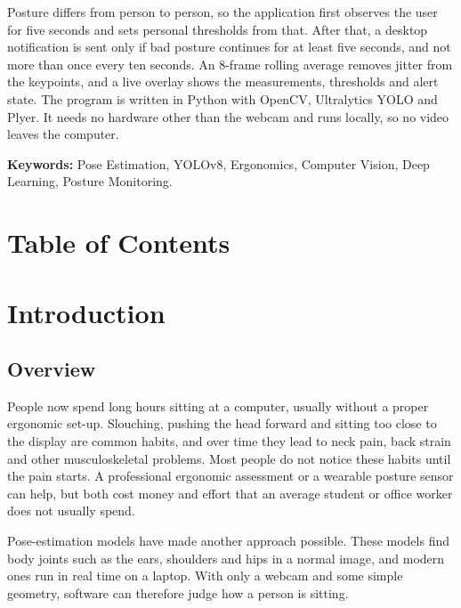 ﻿\documentclass[12pt,a4paper]{article}
\begin{document}
Posture differs from person to person, so the application first observes the user for five
seconds and sets personal thresholds from that. After that, a desktop notification is sent
only if bad posture continues for at least five seconds, and not more than once every ten
seconds. An 8-frame rolling average removes jitter from the keypoints, and a live overlay
shows the measurements, thresholds and alert state. The program is written in Python with
OpenCV, Ultralytics YOLO and Plyer. It needs no hardware other than the webcam and runs
locally, so no video leaves the computer.

\vspace{6pt}
\noindent\textbf{Keywords:} Pose Estimation, YOLOv8, Ergonomics, Computer Vision, Deep
Learning, Posture Monitoring.

\clearpage
\section*{Table of Contents}
\begingroup
{}
\makeatletter{}\makeatother
\endgroup

\clearpage
{}
\section{Introduction}

\subsection{Overview}
People now spend long hours sitting at a computer, usually without a proper ergonomic
set-up. Slouching, pushing the head forward and sitting too close to the display are
common habits, and over time they lead to neck pain, back strain and other
musculoskeletal problems. Most people do not notice these habits until the pain starts. A
professional ergonomic assessment or a wearable posture sensor can help, but both cost
money and effort that an average student or office worker does not usually spend.

Pose-estimation models have made another approach possible. These models find body joints
such as the ears, shoulders and hips in a normal image, and modern ones run in real time on
a laptop. With only a webcam and some simple geometry, software can therefore judge how
a person is sitting.
\end{document}
